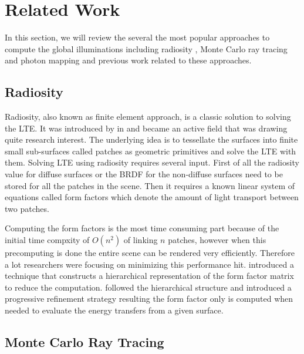 
\section{Related Work}
In this section, we will review the several the most popular approaches to compute the global illuminations including radiosity , Monte Carlo ray tracing and photon mapping and previous work related to these approaches. 


\subsection{Radiosity}

Radiosity, also known as finite element approach, is a classic solution to solving the LTE. It was introduced by  \citeauthor{Goral:1984:MIL:964965.808601} in \citep{Goral:1984:MIL:964965.808601} and became an active field that was drawing quite research interest. The underlying idea is to tessellate the surfaces into finite small sub-surfaces called patches as geometric primitives and solve the LTE with them. Solving LTE using radiosity requires several input. First of all the radiosity value for diffuse surfaces or the BRDF for the non-diffuse surfaces need to be stored for all the patches in the scene. Then it requires a known linear system of equations called form factors which denote the amount of light transport between two patches. 

Computing the form factors is the most time consuming part because of the initial time compxity of \(O(n^{2})\) of linking \(n\) patches, however when this precomputing is done the entire scene can be rendered very efficiently. Therefore a lot researchers were focusing on minimizing this performance hit. \citeauthor{Hanrahan:1991:RHR:127719.122740}\cite{Hanrahan:1991:RHR:127719.122740} introduced a technique that constructs a hierarchical representation of the form factor matrix to reduce the computation. \citeauthor{Holzschuch94anefficient}\cite{Holzschuch94anefficient} followed the hierarchical structure and introduced a progressive refinement strategy resulting the form factor only is computed when needed to evaluate the energy transfers from a given surface. 


\subsection{Monte Carlo Ray Tracing} 
\label{sec:mc_rt} 

